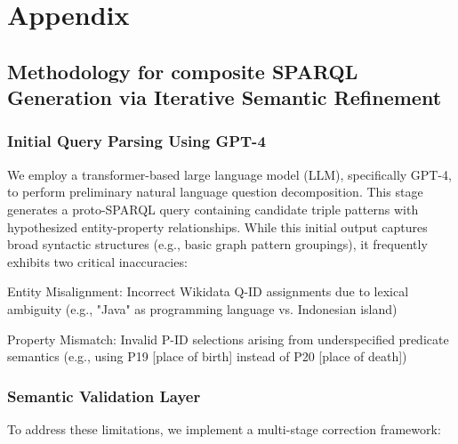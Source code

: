 \appendix
\newpage
\section{Appendix}
\label{sec:appendix}


\subsection{Methodology for composite SPARQL Generation via Iterative Semantic Refinement}\label{sec:sparql}  
\subsubsection{Initial Query Parsing Using GPT-4} We employ a transformer-based large language model (LLM), specifically GPT-4, to perform preliminary natural language question decomposition. This stage generates a proto-SPARQL query containing candidate triple patterns with hypothesized entity-property relationships. While this initial output captures broad syntactic structures (e.g., basic graph pattern groupings), it frequently exhibits two critical inaccuracies:

Entity Misalignment: Incorrect Wikidata Q-ID assignments due to lexical ambiguity (e.g., "Java" as programming language vs. Indonesian island)

Property Mismatch: Invalid P-ID selections arising from underspecified predicate semantics (e.g., using P19 [place of birth] instead of P20 [place of death])

\subsubsection{Semantic Validation Layer} To address these limitations, we implement a multi-stage correction framework:

